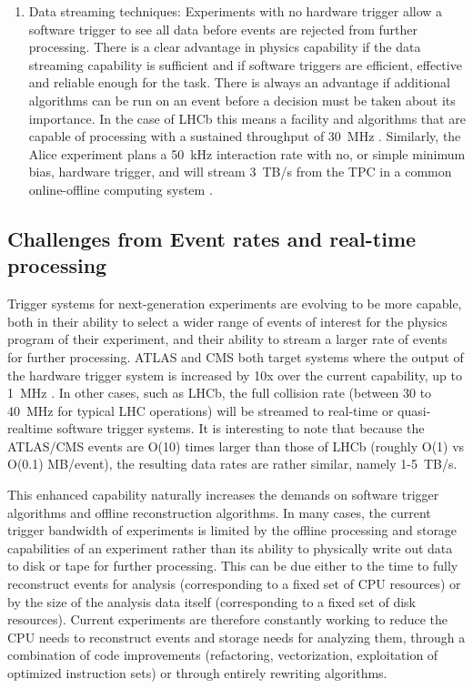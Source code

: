 \begin{enumerate}
\item
Data streaming techniques: Experiments with no hardware trigger allow a software trigger to see all data before events are rejected from further processing. There is a clear advantage in physics 
capability if the data streaming capability is sufficient and if software triggers are efficient, effective and reliable enough for the task. There is always an advantage if additional algorithms 
can be run on an event before a decision must be taken about its importance. In the case of LHCb this means a facility and algorithms that are capable of processing with a sustained throughput 
of 30~MHz \cite{LHCb2014}. Similarly, the Alice experiment plans a 50~kHz interaction rate with no, or simple minimum bias, hardware trigger, and will stream 3~TB/s from the TPC in a common 
online-offline computing system \cite{ALICE2015}.
\end{enumerate}

\subsection{Challenges from Event rates and real-time processing}

Trigger systems for next-generation experiments are evolving to be more capable, both in their ability to select a wider range of events of interest for the physics program of their experiment, 
and their ability to stream a larger rate of events for further processing.  ATLAS and CMS both target systems where the output of the hardware trigger system is increased by 10x over the current 
capability, up to 1~MHz \cite{ATLAS2015,CMS2015}. In other cases, such as LHCb, the full collision rate (between 30 to 40~MHz for typical LHC operations) will be streamed to real-time or quasi-realtime 
software trigger systems. It is interesting to note that because the ATLAS/CMS events are O(10) times larger than those of LHCb (roughly O(1) vs O(0.1) MB/event), the resulting data rates are 
rather similar, namely 1-5~TB/s. 

This enhanced capability naturally increases the demands on software trigger algorithms and offline reconstruction algorithms. In many cases, the current trigger bandwidth of experiments is limited 
by the offline processing and storage capabilities of an experiment rather than its ability to physically write out data to disk or tape for further processing.  This can be due either to the time 
to fully reconstruct events for analysis (corresponding to a fixed set of CPU resources)  or by the size of the analysis data itself (corresponding to a fixed set of disk resources). Current 
experiments are therefore constantly working to reduce the CPU needs to reconstruct events and storage needs for analyzing them, through a combination of code improvements (refactoring, vectorization, 
exploitation of optimized instruction sets) or through entirely rewriting algorithms. 

